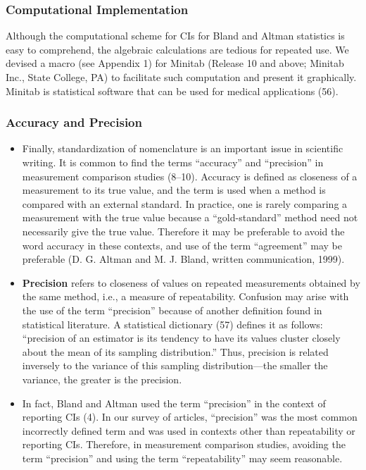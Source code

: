 \documentclass[]{article}
\begin{document}
	\subsubsection*{Computational Implementation}
	Although the computational scheme for CIs for Bland and Altman statistics is easy to comprehend, the algebraic calculations are tedious for repeated use. We devised a macro (see Appendix 1) for Minitab (Release 10 and above; Minitab Inc., State College, PA) to facilitate such computation and present it graphically. Minitab is statistical software that can be used for medical applications (56).
	\newpage
	\subsubsection*{Accuracy and Precision}
	\begin{itemize}
		\item Finally, standardization of nomenclature is an important issue in scientific writing. It is common to find the terms “accuracy” and “precision” in measurement comparison studies (8–10). Accuracy is defined as closeness of a measurement to its true value, and the term is used when a method is compared with an external standard. In practice, one is rarely comparing a measurement with the true value because a “gold-standard” method need not necessarily give the true value. Therefore it may be preferable to avoid the word accuracy in these contexts, and use of the term “agreement” may be preferable (D. G. Altman and M. J. Bland, written communication, 1999). 
		
		\item \textbf{Precision} refers to closeness of values on repeated measurements obtained by the same method, i.e., a measure of repeatability. Confusion may arise with the use of the term “precision” because of another definition found in statistical literature. A statistical dictionary (57) defines it as follows: “precision of an estimator is its tendency to have its values cluster closely about the mean of its sampling distribution.” Thus, precision is related inversely to the variance of this sampling distribution—the smaller the variance, the greater is the precision. 
		
		\item In fact, Bland and Altman used the term “precision” in the context of reporting CIs (4). In our survey of articles, “precision” was the most common incorrectly defined term and was used in contexts other than repeatability or reporting CIs. Therefore, in measurement comparison studies, avoiding the term “precision” and using the term “repeatability” may seem reasonable. 
		

\end{itemize}
\end{document}
